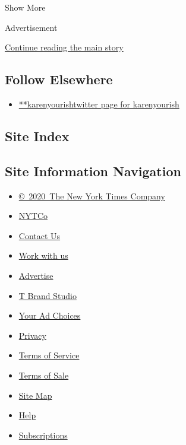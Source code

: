 Show More

Advertisement

\protect\hyperlink{after-mid2}{Continue reading the main story}

\hypertarget{follow-elsewhere}{%
\subsection{Follow Elsewhere}\label{follow-elsewhere}}

\begin{itemize}
\tightlist
\item
  \href{https://twitter.com/karenyourish}{**karenyourishtwitter page for
  karenyourish}
\end{itemize}

\hypertarget{site-index}{%
\subsection{Site Index}\label{site-index}}

\hypertarget{site-information-navigation}{%
\subsection{Site Information
Navigation}\label{site-information-navigation}}

\begin{itemize}
\tightlist
\item
  \href{https://help.nytimes3xbfgragh.onion/hc/en-us/articles/115014792127-Copyright-notice}{©~2020~The
  New York Times Company}
\end{itemize}

\begin{itemize}
\tightlist
\item
  \href{https://www.nytco.com/}{NYTCo}
\item
  \href{https://help.nytimes3xbfgragh.onion/hc/en-us/articles/115015385887-Contact-Us}{Contact
  Us}
\item
  \href{https://www.nytco.com/careers/}{Work with us}
\item
  \href{https://nytmediakit.com/}{Advertise}
\item
  \href{http://www.tbrandstudio.com/}{T Brand Studio}
\item
  \href{https://www.nytimes3xbfgragh.onion/privacy/cookie-policy\#how-do-i-manage-trackers}{Your
  Ad Choices}
\item
  \href{https://www.nytimes3xbfgragh.onion/privacy}{Privacy}
\item
  \href{https://help.nytimes3xbfgragh.onion/hc/en-us/articles/115014893428-Terms-of-service}{Terms
  of Service}
\item
  \href{https://help.nytimes3xbfgragh.onion/hc/en-us/articles/115014893968-Terms-of-sale}{Terms
  of Sale}
\item
  \href{https://spiderbites.nytimes3xbfgragh.onion}{Site Map}
\item
  \href{https://help.nytimes3xbfgragh.onion/hc/en-us}{Help}
\item
  \href{https://www.nytimes3xbfgragh.onion/subscription?campaignId=37WXW}{Subscriptions}
\end{itemize}
